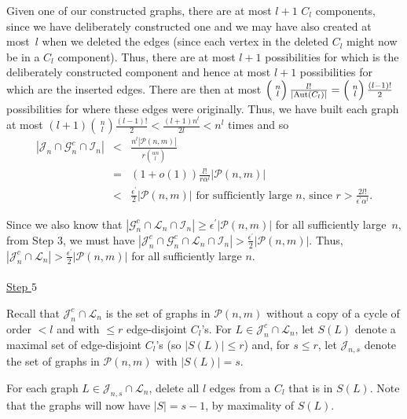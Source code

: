 \documentclass{article}
\newtheorem{Proof of Theorem}{Proof of Theorem}
\begin{document}
Given one of our constructed graphs,
there are at most $l+1$ $C_{l}$ components,
since we have deliberately constructed one and we may have also created at most~$l$ when we deleted the edges
(since each vertex in the deleted $C_{l}$ might now be in a $C_{l}$ component).
Thus, there are at most $l+1$ possibilities for which is the deliberately constructed component
and hence at most $l+1$ possibilities for which are the inserted edges.
There are then at most 
$\left( ^{\phantom{i}n}_{\phantom{q}l} \right) \frac{l!}{|\textrm{\scriptsize{Aut}}(C_{l})|} = 
\left( ^{\phantom{i}n}_{\phantom{q}l} \right) \frac{(l-1)!}{2}$
possibilities for where these edges were originally.
Thus, we have built each graph at most
$(l+1) \left( ^{\phantom{i}n}_{\phantom{q}l} \right) \frac{(l-1)!}{2} < \frac{(l+1)n^{l}}{2l} < n^{l}$ times
and so 
\begin{eqnarray*}
|\mathcal{J}_{n} \cap \mathcal{G}_{n}^{c} \cap \mathcal{I}_{n}|
& < & \frac{n^{l} |\mathcal{P}(n,m)|}{ r \left( ^{\alpha n}_{\phantom{q}l} \right)} \\
& = & (1+o(1)) \frac{l!}{r \alpha ^{l}} |\mathcal{P}(n,m)| \\
& < & \frac{\epsilon^{\prime}}{2} |\mathcal{P}(n,m)| 
\textrm{ for sufficiently large $n$, since } r > \frac{2l!}{\epsilon^{\prime} \alpha^{l}}. 
\end{eqnarray*}

Since we also know that
$|\mathcal{G}_{n}^{c} \cap \mathcal{L}_{n} \cap \mathcal{I}_{n}| \geq \epsilon^{\prime} |\mathcal{P}(n,m)|$
for all sufficiently large~$n$,
from Step $3$,
we must have
$|\mathcal{J}_{n}^{c} \cap \mathcal{G}_{n}^{c} \cap \mathcal{L}_{n} \cap \mathcal{I}_{n}| > 
\frac{\epsilon^{\prime}}{2} |\mathcal{P}(n,m)|$.
Thus, $|\mathcal{J}_{n}^{c} \cap \mathcal{L}_{n}| > \frac{\epsilon^{\prime}}{2} |\mathcal{P}(n,m)|$
for all sufficiently large $n$. \\
\\
\underline{Step $5$}

Recall that $\mathcal{J}_{n}^{c} \cap \mathcal{L}_{n}$
is the set of graphs in $\mathcal{P}(n,m)$ without a copy of a cycle of order $<l$
and with $\leq r$ edge-disjoint $C_{l}$'s.
For $L \in \mathcal{J}_{n}^{c} \cap \mathcal{L}_{n}$,
let $S(L)$ denote a maximal set of edge-disjoint $C_{l}$'s (so $|S(L)| \leq r$)
and, for $s \leq r$, let $\mathcal{J}_{n,s}$ denote the set of graphs in $\mathcal{P}(n,m)$ with $|S(L)|=s$.

For each graph $L \in \mathcal{J}_{n,s} \cap \mathcal{L}_{n}$,
delete all $l$ edges from a $C_{l}$ that is in $S(L)$.
Note that the graphs will now have $|S|=s-1$,
by maximality of $S(L)$.
\end{document}
